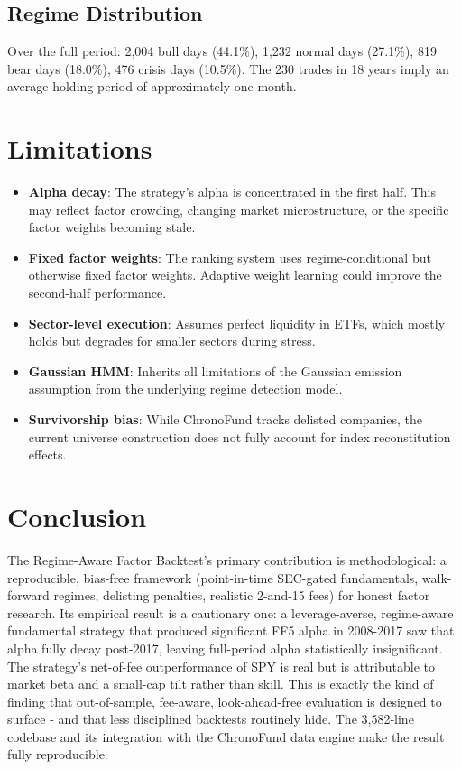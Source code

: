 \documentclass[11pt]{article}
\begin{document}
\subsection{Regime Distribution}
Over the full period: 2,004 bull days (44.1\%), 1,232 normal days (27.1\%), 819 bear days (18.0\%), 476 crisis days (10.5\%). The 230 trades in 18 years imply an average holding period of approximately one month.

\section{Limitations}

\begin{itemize}[nosep]
    \item \textbf{Alpha decay}: The strategy's alpha is concentrated in the first half. This may reflect factor crowding, changing market microstructure, or the specific factor weights becoming stale.
    \item \textbf{Fixed factor weights}: The ranking system uses regime-conditional but otherwise fixed factor weights. Adaptive weight learning could improve the second-half performance.
    \item \textbf{Sector-level execution}: Assumes perfect liquidity in ETFs, which mostly holds but degrades for smaller sectors during stress.
    \item \textbf{Gaussian HMM}: Inherits all limitations of the Gaussian emission assumption from the underlying regime detection model.
    \item \textbf{Survivorship bias}: While ChronoFund tracks delisted companies, the current universe construction does not fully account for index reconstitution effects.
\end{itemize}

\section{Conclusion}

The Regime-Aware Factor Backtest's primary contribution is methodological: a
reproducible, bias-free framework (point-in-time SEC-gated fundamentals, walk-forward
regimes, delisting penalties, realistic 2-and-15 fees) for honest factor research.
Its empirical result is a cautionary one: a leverage-averse, regime-aware fundamental
strategy that produced significant FF5 alpha in 2008-2017 saw that alpha fully decay
post-2017, leaving full-period alpha statistically insignificant. The strategy's
net-of-fee outperformance of SPY is real but is attributable to market beta and a
small-cap tilt rather than skill. This is exactly the kind of finding that
out-of-sample, fee-aware, look-ahead-free evaluation is designed to surface - and
that less disciplined backtests routinely hide. The 3,582-line codebase and its
integration with the ChronoFund data engine make the result fully reproducible.
\end{document}
